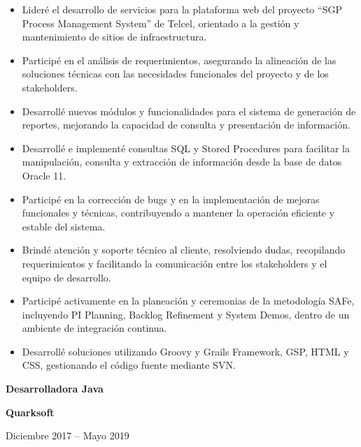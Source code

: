 \documentclass[10pt,letterpaper]{article}
\newcommand{\jobtitle}[1]{
    {\bfseries #1}
}
\newcommand{\company}[1]{
    {\bfseries\color{DarkGray} #1}
}
\newcommand{\jobdate}[1]{
    {\color{MediumGray} #1}
}
\begin{document}
\begin{itemize}

\item Lideré el desarrollo de servicios para la plataforma web del proyecto ``SGP Process Management System'' de Telcel, orientado a la gestión y mantenimiento de sitios de infraestructura.

\item Participé en el análisis de requerimientos, asegurando la alineación de las soluciones técnicas con las necesidades funcionales del proyecto y de los stakeholders.

\item Desarrollé nuevos módulos y funcionalidades para el sistema de generación de reportes, mejorando la capacidad de consulta y presentación de información.

\item Desarrollé e implementé consultas SQL y Stored Procedures para facilitar la manipulación, consulta y extracción de información desde la base de datos Oracle 11.

\item Participé en la corrección de bugs y en la implementación de mejoras funcionales y técnicas, contribuyendo a mantener la operación eficiente y estable del sistema.

\item Brindé atención y soporte técnico al cliente, resolviendo dudas, recopilando requerimientos y facilitando la comunicación entre los stakeholders y el equipo de desarrollo.

\item Participé activamente en la planeación y ceremonias de la metodología SAFe, incluyendo PI Planning, Backlog Refinement y System Demos, dentro de un ambiente de integración continua.

\item Desarrollé soluciones utilizando Groovy y Grails Framework, GSP, HTML y CSS, gestionando el código fuente mediante SVN.

\end{itemize}



\jobtitle{Desarrolladora Java} \textbar{}
\company{Quarksoft}
\hfill \textbar{}
\jobdate{Diciembre 2017 -- Mayo 2019}
\end{document}
